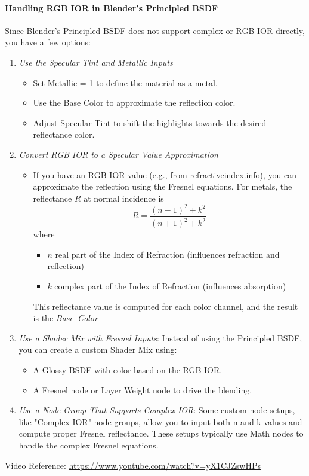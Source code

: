 \documentclass{article}
\begin{document}
\paragraph{Handling RGB IOR in Blender's Principled BSDF}
Since Blender's Principled BSDF does not support complex or RGB IOR directly, you have a few options:
\begin{enumerate}[noitemsep, topsep=0pt]
    \item \textit{Use the Specular Tint and Metallic Inputs}
    \begin{itemize}[noitemsep, topsep=0pt]
        \item Set Metallic = 1 to define the material as a metal.
        \item Use the Base Color to approximate the reflection color.
        \item Adjust Specular Tint to shift the highlights towards the desired reflectance color.
    \end{itemize}
    \item \textit{Convert RGB IOR to a Specular Value Approximation}
    \begin{itemize}[noitemsep, topsep=0pt]
        \item If you have an RGB IOR value (e.g., from refractiveindex.info), you can approximate the reflection using the Fresnel equations. For metals, the reflectance $\bar{R}$ at
        normal incidence is \[ R = \frac{(n-1)^2+k^2}{(n+1)^2+k^2} \] where
        \begin{itemize}[noitemsep, topsep=0pt]
            \item[] $n$ real part of the Index of Refraction (influences refraction and reflection)
            \item[] $k$ complex part of the Index of Refraction (influences absorption)
        \end{itemize}
        This reflectance value is computed for each color channel, and the result is the \mbox{\textit{Base Color}}
    \end{itemize}
    \item \textit{Use a Shader Mix with Fresnel Inputs}: Instead of using the Principled BSDF, you can create a custom Shader Mix using:
    \begin{itemize}[topsep=0pt, noitemsep]
        \item A Glossy BSDF with color based on the RGB IOR.
        \item A Fresnel node or Layer Weight node to drive the blending.
    \end{itemize}
    \item \textit{Use a Node Group That Supports Complex IOR}: Some custom node setups, like "Complex IOR" node groups, allow you to 
    input both n and k values and compute proper Fresnel reflectance. These setups typically use Math nodes to handle the complex Fresnel equations.
\end{enumerate}
Video Reference: \url{https://www.youtube.com/watch?v=yX1CJZswHPs}
\end{document}
